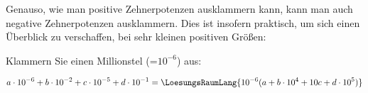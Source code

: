 Genauso, wie man positive Zehnerpotenzen ausklammern kann, kann man auch negative Zehnerpotenzen ausklammern. Dies ist insofern praktisch, um sich einen Überblick zu verschaffen, bei sehr kleinen positiven Größen:

Klammern Sie einen Millionstel (=$10^{-6}$) aus:


$$a\cdot{}10^{-6} + b\cdot{}10^{-2} + c\cdot{}10^{-5} + d\cdot{}10^{-1} = \LoesungsRaumLang{10^{-6} (a + b\cdot{}10^4 + 10c + d\cdot{}10^{5})}$$

